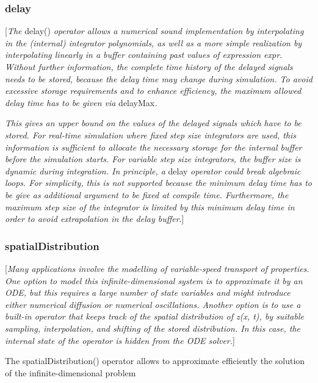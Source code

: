 \subsubsection{delay}

{[}\emph{The} delay() \emph{operator allows a numerical sound
implementation by interpolating in the (internal) integrator
polynomials, as well as a more simple realization by interpolating
linearly in a buffer containing past values of expression expr. Without
further information, the complete time history of the delayed signals
needs to be stored, because the delay time may change during simulation.
To avoid excessive storage requirements and to enhance efficiency, the
maximum allowed delay time has to be given via} delayMax\emph{. }

\emph{This gives an upper bound on the values of the delayed signals
which have to be stored. For real-time simulation where fixed step size
integrators are used, this information is sufficient to allocate the
necessary storage for the internal buffer before the simulation starts.
For variable step size integrators, the buffer size is dynamic during
integration. In principle, a} delay \emph{operator could break algebraic
loops. For simplicity, this is not supported because the minimum delay
time has to be give as additional argument to be fixed at compile time.
Furthermore, the maximum step size of the integrator is limited by this
minimum delay time in order to avoid extrapolation in the delay
buffer}.{]}

\subsubsection{spatialDistribution}

{[}\emph{Many applications involve the modelling of variable-speed
transport of properties. One option to model this infinite-dimensional
system is to approximate it by an ODE, but this requires a large number
of state variables and might introduce either numerical diffusion or
numerical oscillations. Another option is to use a built-in operator
that keeps track of the spatial distribution of z(x, t), by suitable
sampling, interpolation, and shifting of the stored distribution. In
this case, the internal state of the operator is hidden from the ODE
solver.}{]}

The spatialDistribution() operator allows to approximate efficiently the
solution of the infinite-dimensional problem

